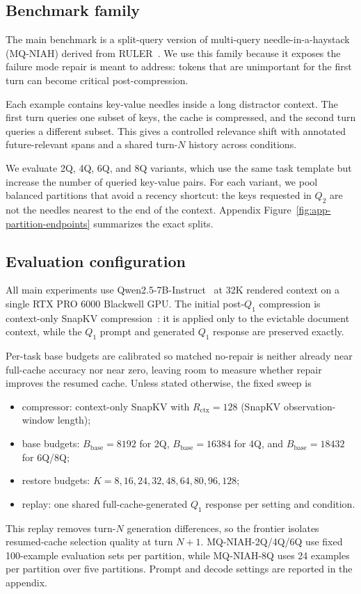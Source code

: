 \documentclass{article}
\newcommand{\bbase}{\ensuremath{B_{\mathrm{base}}}}
\begin{document}
\subsection{Benchmark family}
{\color{red}
The main benchmark is a split-query version of multi-query needle-in-a-haystack (MQ-NIAH) derived from RULER~\citep{ruler}. We use this family because it exposes the failure mode repair is meant to address: tokens that are unimportant for the first turn can become critical post-compression.

Each example contains key-value needles inside a long distractor context. The first turn queries one subset of keys, the cache is compressed, and the second turn queries a different subset. This gives a controlled relevance shift with annotated future-relevant spans and a shared turn-$N$ history across conditions.

We evaluate 2Q, 4Q, 6Q, and 8Q variants, which use the same task template but increase the number of queried key-value pairs. For each variant, we pool balanced partitions that avoid a recency shortcut: the keys requested in $Q_2$ are not the needles nearest to the end of the context. Appendix Figure~\ref{fig:app-partition-endpoints} summarizes the exact splits.}

\subsection{Evaluation configuration}
{\color{red}All main experiments use Qwen2.5-7B-Instruct~\citep{qwen} at 32K rendered context on a single RTX PRO 6000 Blackwell GPU. The initial post-$Q_1$ compression is context-only SnapKV compression~\citep{snapkv}: it is applied only to the evictable document context, while the $Q_1$ prompt and generated $Q_1$ response are preserved exactly.}

Per-task base budgets are calibrated so matched no-repair is neither already near full-cache accuracy nor near zero, leaving room to measure whether repair improves the resumed cache. Unless stated otherwise, the fixed sweep is 
\begin{itemize}[leftmargin=1.4em,noitemsep,topsep=2pt]
    \item compressor: context-only SnapKV with
    $R_{\mathrm{ctx}}=128$ (SnapKV observation-window length);
    \item base budgets: $\bbase=8192$ for 2Q, $\bbase=16384$
  for 4Q, and
    $\bbase=18432$ for 6Q/8Q;
    \item restore budgets: $K=8,16,24,32,48,64,80,96,128$;
    \item replay: one shared full-cache-generated $Q_1$
  response per setting and
    condition.
  \end{itemize}
{\color{red}This replay removes turn-$N$ generation differences, so the frontier isolates resumed-cache selection quality at turn $N{+}1$. MQ-NIAH-2Q/4Q/6Q use fixed 100-example evaluation sets per partition, while MQ-NIAH-8Q uses 24 examples per partition over five partitions.} Prompt and decode settings are reported in the appendix.
\end{document}
